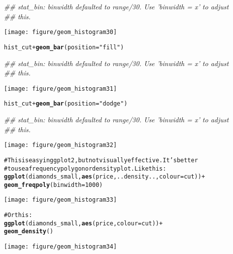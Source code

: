 \documentclass[a4paper,titlepage]{tufte-handout}\usepackage{graphicx, color}
\makeatletter
\def\maxwidth{ %
  \ifdim\Gin@nat@width>\linewidth
    \linewidth
  \else
    \Gin@nat@width
  \fi
}
\newcommand{\hlfunctioncall}[1]{\textcolor[rgb]{0.501960784313725,0,0.329411764705882}{\textbf{#1}}}%
\newcommand{\hlstring}[1]{\textcolor[rgb]{0.6,0.6,1}{#1}}%
\newcommand{\hlcomment}[1]{\textcolor[rgb]{0.180392156862745,0.6,0.341176470588235}{#1}}%
\newenvironment{kframe}{%
 \def\at@end@of@kframe{}%
 \ifinner\ifhmode%
  \def\at@end@of@kframe{\end{minipage}}%
  \begin{minipage}{\columnwidth}%
 \fi\fi%
 \def\FrameCommand##1{\hskip\@totalleftmargin \hskip-\fboxsep
 \colorbox{shadecolor}{##1}\hskip-\fboxsep
     \hskip-\linewidth \hskip-\@totalleftmargin \hskip\columnwidth}%
 \MakeFramed {\advance\hsize-\width
   \@totalleftmargin\z@ \linewidth\hsize
   \@setminipage}}%
 {\par\unskip\endMakeFramed%
 \at@end@of@kframe}
\newenvironment{knitrout}{}{} %
\makeatother
\begin{document}
\begin{knitrout}
\begin{kframe}
\begin{alltt}
\end{alltt}
\begin{flushleft}\ttfamily\noindent\itshape\textcolor{messagecolor}{\#\# stat\_bin: binwidth defaulted to range/30. Use 'binwidth = x' to adjust \\ 
\#\# this.}\end{flushleft}\end{kframe}\texttt{[image: figure/geom\_histogram30]} \begin{kframe}\begin{alltt}
hist_cut + \hlfunctioncall{geom_bar}(position=\hlstring{"fill"})
\end{alltt}
\begin{flushleft}\ttfamily\noindent\itshape\textcolor{messagecolor}{\#\# stat\_bin: binwidth defaulted to range/30. Use 'binwidth = x' to adjust \\ 
\#\# this.}\end{flushleft}\end{kframe}\texttt{[image: figure/geom\_histogram31]} \begin{kframe}\begin{alltt}
hist_cut + \hlfunctioncall{geom_bar}(position=\hlstring{"dodge"})
\end{alltt}
\begin{flushleft}\ttfamily\noindent\itshape\textcolor{messagecolor}{\#\# stat\_bin: binwidth defaulted to range/30. Use 'binwidth = x' to adjust \\ 
\#\# this.}\end{flushleft}\end{kframe}\texttt{[image: figure/geom\_histogram32]} \begin{kframe}\begin{alltt}
\hlcomment{# This is easy in ggplot2, but not visually effective.  It's better}
\hlcomment{# to use a frequency polygon or density plot.  Like this:}
\hlfunctioncall{ggplot}(diamonds_small, \hlfunctioncall{aes}(price, ..density.., colour = cut)) +
  \hlfunctioncall{geom_freqpoly}(binwidth = 1000)
\end{alltt}
\end{kframe}\texttt{[image: figure/geom\_histogram33]} \begin{kframe}\begin{alltt}
\hlcomment{# Or this:}
\hlfunctioncall{ggplot}(diamonds_small, \hlfunctioncall{aes}(price, colour = cut)) +
  \hlfunctioncall{geom_density}()
\end{alltt}
\end{kframe}\texttt{[image: figure/geom\_histogram34]} \begin{kframe}\begin{alltt}

\end{alltt}
\end{kframe}
\end{knitrout}
\end{document}
